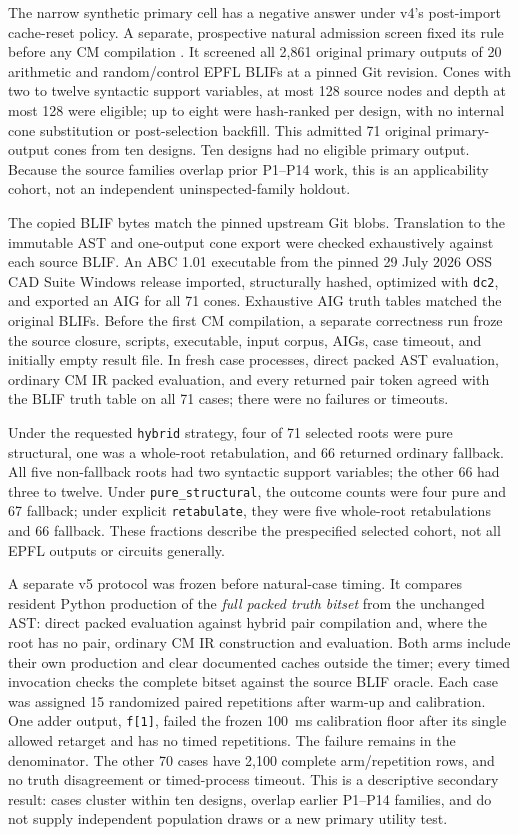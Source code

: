 \documentclass[10pt]{article}
\theoremstyle{plain}
\theoremstyle{definition}
\theoremstyle{remark}
\begin{document}
The narrow synthetic primary cell has a negative answer under v4's post-import cache-reset policy. A separate, prospective natural admission screen fixed its rule before any CM compilation \cite{NaturalAdmission2026}. It screened all 2,861 original primary outputs of 20 arithmetic and random/control EPFL BLIFs at a pinned Git revision. Cones with two to twelve syntactic support variables, at most 128 source nodes and depth at most 128 were eligible; up to eight were hash-ranked per design, with no internal cone substitution or post-selection backfill. This admitted 71 original primary-output cones from ten designs. Ten designs had no eligible primary output. Because the source families overlap prior P1--P14 work, this is an applicability cohort, not an independent uninspected-family holdout.

The copied BLIF bytes match the pinned upstream Git blobs. Translation to the immutable AST and one-output cone export were checked exhaustively against each source BLIF. An ABC 1.01 executable from the pinned 29 July 2026 OSS CAD Suite Windows release imported, structurally hashed, optimized with \texttt{dc2}, and exported an AIG for all 71 cones. Exhaustive AIG truth tables matched the original BLIFs. Before the first CM compilation, a separate correctness run froze the source closure, scripts, executable, input corpus, AIGs, case timeout, and initially empty result file. In fresh case processes, direct packed AST evaluation, ordinary CM IR packed evaluation, and every returned pair token agreed with the BLIF truth table on all 71 cases; there were no failures or timeouts.

Under the requested \texttt{hybrid} strategy, four of 71 selected roots were pure structural, one was a whole-root retabulation, and 66 returned ordinary fallback. All five non-fallback roots had two syntactic support variables; the other 66 had three to twelve. Under \texttt{pure\_structural}, the outcome counts were four pure and 67 fallback; under explicit \texttt{retabulate}, they were five whole-root retabulations and 66 fallback. These fractions describe the prespecified selected cohort, not all EPFL outputs or circuits generally.

A separate v5 protocol was frozen before natural-case timing. It compares resident Python production of the \emph{full packed truth bitset} from the unchanged AST: direct packed evaluation against hybrid pair compilation and, where the root has no pair, ordinary CM IR construction and evaluation. Both arms include their own production and clear documented caches outside the timer; every timed invocation checks the complete bitset against the source BLIF oracle. Each case was assigned 15 randomized paired repetitions after warm-up and calibration. One adder output, \texttt{f[1]}, failed the frozen 100~ms calibration floor after its single allowed retarget and has no timed repetitions. The failure remains in the denominator. The other 70 cases have 2,100 complete arm/repetition rows, and no truth disagreement or timed-process timeout. This is a descriptive secondary result: cases cluster within ten designs, overlap earlier P1--P14 families, and do not supply independent population draws or a new primary utility test.
\end{document}
